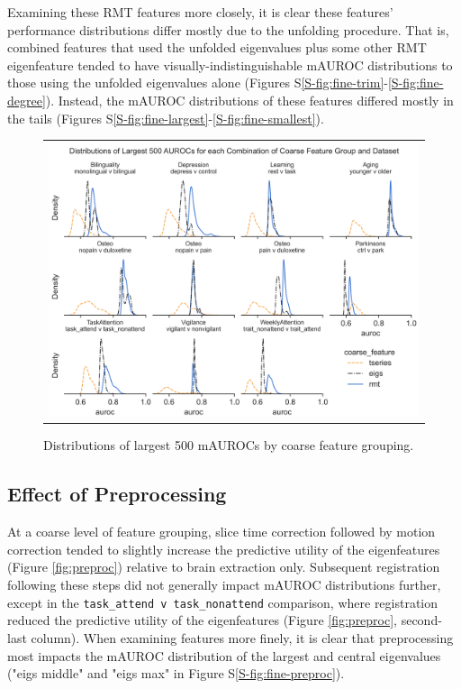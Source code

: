 \documentclass[12pt]{spieman}  %
\newcommand{\code}[1]{\small\texttt{#1}\normalsize}
\begin{document}
\begin{spacing}{2}
Examining these RMT features more closely, it is clear these features'
performance distributions differ mostly due to the unfolding procedure. That
is, combined features that used the unfolded eigenvalues plus some other RMT
eigenfeature tended to have visually-indistinguishable mAUROC distributions to
those using the unfolded eigenvalues alone (Figures
S\ref{S-fig:fine-trim}-\ref{S-fig:fine-degree}). Instead, the mAUROC
distributions of these features differed mostly in the tails (Figures
S\ref{S-fig:fine-largest}-\ref{S-fig:fine-smallest}).


\begin{figure}
\begin{center}
\begin{tabular}{c}
\includegraphics[width=6.5in]{coarse_feature_largest_by_subgroup.png}
\end{tabular}
\end{center}
\caption
{ \label{fig:largest} Distributions of largest 500 mAUROCs by coarse feature grouping.}
\end{figure}

\subsection{Effect of Preprocessing}
At a coarse level of feature grouping, slice time correction followed by motion
correction tended to slightly increase the predictive utility of the
eigenfeatures (Figure \ref{fig:preproc}) relative to brain extraction only.
Subsequent registration following these steps did not generally impact mAUROC
distributions further, except in the \code{task\_attend v task\_nonattend}
comparison, where registration reduced the predictive utility of the
eigenfeatures (Figure \ref{fig:preproc}, second-last column). When examining
features more finely, it is clear that preprocessing most impacts the mAUROC
distribution of the largest and central eigenvalues ("eigs middle" and "eigs
max" in Figure S\ref{S-fig:fine-preproc}).



\end{spacing}
\end{document}
